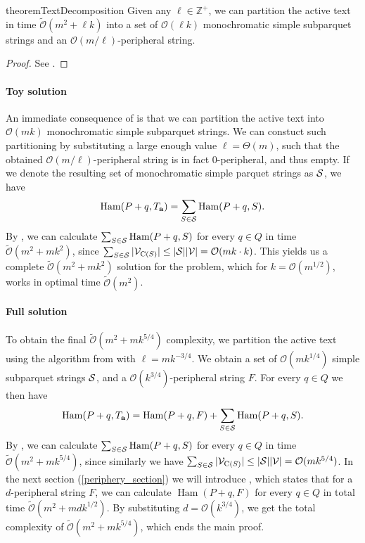 \documentclass[11pt]{article}
\newcommand{\Z}{\mathbb{Z}}
\renewcommand{\O}{\mathcal{O}}
\newcommand{\tO}{\tilde{\mathcal{O}}}
\theoremstyle{plain}
\theoremstyle{definition}
\theoremstyle{remark}
\DeclareMathOperator*{\Ham}{Ham}
\begin{document}
\begin{restatable*}{theorem}{TextDecomposition}\label{text_decomposition}
	Given any $\ell \in \Z^+$, we can partition the active text in time $\tO(m^2 + \ell k)$ into a set of $\O(\ell k)$ monochromatic simple subparquet strings and an $\O(m / \ell)$-peripheral string.
\end{restatable*}
\begin{proof} See . \end{proof}

\paragraph{Toy solution}
An immediate consequence of  is that we can partition the active text into $\O(mk)$ monochromatic simple subparquet strings.
We can constuct such partitioning by substituting a large enough value $\ell = \Theta(m)$, such that the obtained $\O(m / \ell)$-peripheral string is in fact $0$-peripheral, and thus empty.
If we denote the resulting set of monochromatic simple parquet strings as $\S$, we have
\[ \Ham(P + q, \Ta) = \sum_{S \in \S} \Ham(P + q, S).\]
By , we can calculate $\sum_{S \in \S} \Ham(P + q, S)$ for every $q \in Q$ in time $\tO(m^2 + mk^{2})$,
since $\sum_{S \in \S} |\V_{\getchar{S}}| \le |\S| |\V| = \O(mk \cdot k)$.
This yields us a complete $\tO(m^2 + mk^2)$ solution for the \HD problem, which for $k = \O(m ^ {1/2})$, works in optimal time $\tO(m^2)$.

\paragraph{Full solution}
To obtain the final $\tO(m^2 + mk^{5/4})$ complexity, we partition the active text using the algorithm from  with $\ell = mk^{-3/4}$.
We obtain a set of $\O(mk^{1/4})$ simple subparquet strings $\S$, and a $\O(k^{3 / 4})$-peripheral string $F$.
For every $q \in Q$ we then have
\[ \Ham(P + q, \Ta) = \Ham(P + q, F) + \sum_{S \in \S} \Ham(P + q, S).\]
By , we can calculate $\sum_{S \in \S} \Ham(P + q, S)$ for every $q \in Q$ in time $\tO(m^2 + mk^{5/4})$,
since similarly we have $\sum_{S \in \S} |\V_{\getchar{S}}| \le |\S| |\V| = \O(mk^{5/4})$.
In the next section (\ref{periphery_section}) we will introduce , which states that for a $d$-peripheral string $F$, we can calculate $\Ham(P + q, F)$ for every $q \in Q$ in total time $\tO(m^2 + mdk^{1/2})$.
By substituting $d = \O(k^{3/4})$, we get the total complexity of $\tO(m^2 + mk^{5/4})$, which ends the main proof.
\end{document}
